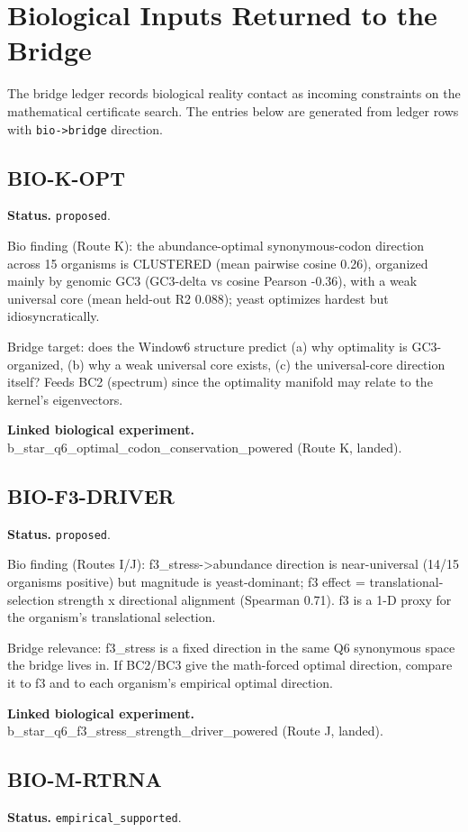 \section{Biological Inputs Returned to the Bridge}
The bridge ledger records biological reality contact as incoming constraints on the
mathematical certificate search.  The entries below are generated from ledger rows with
\texttt{bio->bridge} direction.

\subsection{BIO-K-OPT}
\textbf{Status.} \texttt{proposed}.

Bio finding (Route K): the abundance-optimal synonymous-codon direction across 15 organisms is
CLUSTERED (mean pairwise cosine 0.26), organized mainly by genomic GC3 (GC3-delta vs cosine Pearson
-0.36), with a weak universal core (mean held-out R2 0.088); yeast optimizes hardest but
idiosyncratically.

Bridge target: does the Window6 structure predict (a) why optimality is GC3-organized, (b) why a
weak universal core exists, (c) the universal-core direction itself? Feeds BC2 (spectrum) since the
optimality manifold may relate to the kernel's eigenvectors.

\textbf{Linked biological experiment.} b\_star\_q6\_optimal\_codon\_conservation\_powered (Route K, landed).

\subsection{BIO-F3-DRIVER}
\textbf{Status.} \texttt{proposed}.

Bio finding (Routes I/J): f3\_stress->abundance direction is near-universal (14/15 organisms
positive) but magnitude is yeast-dominant; f3 effect = translational-selection strength x
directional alignment (Spearman 0.71). f3 is a 1-D proxy for the organism's translational selection.

Bridge relevance: f3\_stress is a fixed direction in the same Q6 synonymous space the bridge lives
in. If BC2/BC3 give the math-forced optimal direction, compare it to f3 and to each organism's
empirical optimal direction.

\textbf{Linked biological experiment.} b\_star\_q6\_f3\_stress\_strength\_driver\_powered (Route J, landed).

\subsection{BIO-M-RTRNA}
\textbf{Status.} \texttt{empirical\_supported}.

